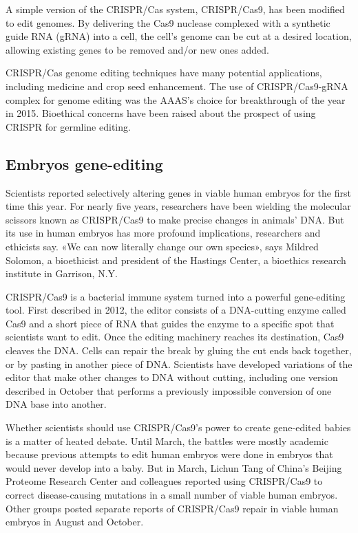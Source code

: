 \documentclass[12pt]{article}
\begin{document}
A simple version of the CRISPR/Cas system, CRISPR/Cas9, has been modified to edit genomes. By delivering the Cas9 nuclease complexed with a synthetic guide RNA (gRNA) into a cell, the cell's genome can be cut at a desired location, allowing existing genes to be removed and/or new ones added.

CRISPR/Cas genome editing techniques have many potential applications, including medicine and crop seed enhancement. The use of CRISPR/Cas9-gRNA complex for genome editing was the AAAS's choice for breakthrough of the year in 2015. Bioethical concerns have been raised about the prospect of using CRISPR for germline editing.

\subsection{Embryos gene-editing}
Scientists reported selectively altering genes in viable human embryos for the first time this year. For nearly five years, researchers have been wielding the molecular scissors known as CRISPR/Cas9 to make precise changes in animals' DNA. But its use in human embryos has more profound implications, researchers and ethicists say. «We can now literally change our own species», says Mildred Solomon, a bioethicist and president of the Hastings Center, a bioethics research institute in Garrison, N.Y.

CRISPR/Cas9 is a bacterial immune system turned into a powerful gene-editing tool. First described in 2012, the editor consists of a DNA-cutting enzyme called Cas9 and a short piece of RNA that guides the enzyme to a specific spot that scientists want to edit. Once the editing machinery reaches its destination, Cas9 cleaves the DNA. Cells can repair the break by gluing the cut ends back together, or by pasting in another piece of DNA. Scientists have developed variations of the editor that make other changes to DNA without cutting, including one version described in October that performs a previously impossible conversion of one DNA base into another.

Whether scientists should use CRISPR/Cas9's power to create gene-edited babies is a matter of heated debate. Until March, the battles were mostly academic because previous attempts to edit human embryos were done in embryos that would never develop into a baby. But in March, Lichun Tang of China’s Beijing Proteome Research Center and colleagues reported using CRISPR/Cas9 to correct disease-causing mutations in a small number of viable human embryos. Other groups posted separate reports of CRISPR/Cas9 repair in viable human embryos in August and October.
\end{document}
